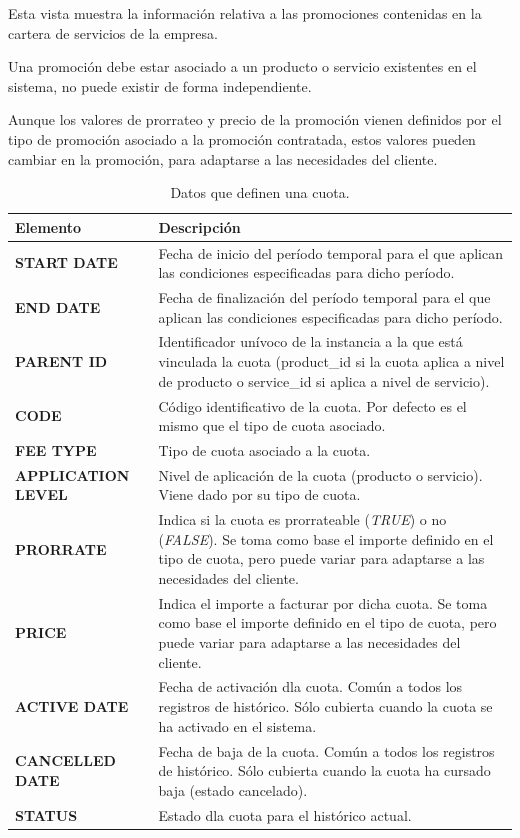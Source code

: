 Esta vista muestra la información relativa a las promociones contenidas en la cartera de servicios de la empresa.

Una promoción debe estar asociado a un producto o servicio existentes en el sistema, no puede existir de forma independiente.

Aunque los valores de prorrateo y precio de la promoción vienen definidos por el tipo de promoción asociado a la promoción contratada, estos valores pueden cambiar en la promoción, para adaptarse a las necesidades del cliente.



\begin{table}[H]
  \centering
  \setlength{\leftmargini}{0.4cm}
  \resizebox{14cm}{!} {
  \begin{tabular}{|m{6cm} m{8cm}|}
  \rowcolor{udcpink!25}
  \hline
  	\textbf{Elemento} & \textbf{Descripción} \\\hline
  	\textbf{START DATE} & Fecha de inicio del período temporal para el que aplican las condiciones especificadas para dicho período.\\
  	\textbf{END DATE} & Fecha de finalización del período temporal para el que aplican las condiciones especificadas para dicho período.\\
	\textbf{PARENT ID} & Identificador unívoco de la instancia a la que está vinculada la cuota (product\_id si la cuota aplica a nivel de producto o service\_id si aplica a nivel de servicio).\\
	\textbf{CODE} & Código identificativo de la cuota. Por defecto es el mismo que el tipo de cuota asociado.\\	
	\textbf{FEE TYPE} & Tipo de cuota asociado a la cuota.\\
	\textbf{APPLICATION LEVEL} & Nivel de aplicación de la cuota (producto o servicio). Viene dado por su tipo de cuota.\\
	\textbf{PRORRATE} & Indica si la cuota es prorrateable (\textit{TRUE}) o no (\textit{FALSE}). Se toma como base el importe definido en el tipo de cuota, pero puede variar para adaptarse a las necesidades del cliente.\\
	\textbf{PRICE} & Indica el importe a facturar por dicha cuota. Se toma como base el importe definido en el tipo de cuota, pero puede variar para adaptarse a las necesidades del cliente.\\
	\textbf{ACTIVE DATE} & Fecha de activación dla cuota. Común a todos los registros de histórico. Sólo cubierta cuando la cuota se ha activado en el sistema.\\
	\textbf{CANCELLED DATE} & Fecha de baja de la cuota. Común a todos los registros de histórico. Sólo cubierta cuando la cuota ha cursado baja (estado cancelado).\\
	\textbf{STATUS} & Estado dla cuota para el histórico actual.	
	\\\hline
  \end{tabular}
  } %
  \caption{Datos que definen una cuota.}
  \label{tab:cuota}
\end{table}



